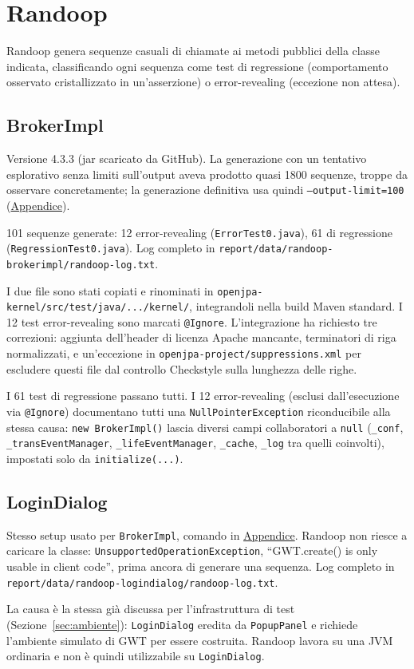 \section{Randoop}
\label{sec:randoop}

Randoop genera sequenze casuali di chiamate ai metodi pubblici della classe indicata,
classificando ogni sequenza come test di regressione (comportamento osservato cristallizzato in
un'asserzione) o error-revealing (eccezione non attesa).

\subsection{BrokerImpl}

Versione 4.3.3 (jar scaricato da GitHub).
La generazione con un tentativo esplorativo senza limiti sull'output aveva prodotto
quasi 1800 sequenze, troppe da osservare concretamente; la generazione definitiva usa quindi
\texttt{--output-limit=100} (\hyperref[cmd:randoop-brokerimpl]{Appendice}).

101 sequenze generate: 12 error-revealing (\texttt{ErrorTest0.java}), 61 di regressione
(\texttt{RegressionTest0.java}). Log completo in
\texttt{report/data/randoop-brokerimpl/randoop-log.txt}.

I due file sono stati copiati e rinominati in \texttt{openjpa-kernel/src/test/java/.../kernel/}, integrandoli
nella build Maven standard. I 12 test error-revealing sono marcati \texttt{@Ignore}. L'integrazione ha
richiesto tre correzioni: aggiunta dell'header di licenza Apache mancante, terminatori di riga normalizzati, e un'eccezione in
\texttt{openjpa-project/suppressions.xml} per escludere questi file dal controllo Checkstyle sulla
lunghezza delle righe.

I 61 test di regressione passano tutti. I 12 error-revealing (esclusi dall'esecuzione via
\texttt{@Ignore}) documentano tutti una \texttt{NullPointerException} riconducibile alla stessa
causa: \texttt{new BrokerImpl()} lascia diversi campi collaboratori a \texttt{null}
(\texttt{\_conf}, \texttt{\_transEventManager}, \texttt{\_lifeEventManager}, \texttt{\_cache},
\texttt{\_log} tra quelli coinvolti), impostati solo da \texttt{initialize(...)}.

\subsection{LoginDialog}

Stesso setup usato per \texttt{BrokerImpl}, comando in
\hyperref[cmd:randoop-logindialog]{Appendice}. Randoop non riesce a caricare la classe:
\texttt{UnsupportedOperationException}, ``GWT.create() is only usable in client code'', prima
ancora di generare una sequenza. Log completo in
\texttt{report/data/randoop-logindialog/randoop-log.txt}.

La causa è la stessa già discussa per l'infrastruttura di test (Sezione~\ref{sec:ambiente}):
\texttt{LoginDialog} eredita da \texttt{PopupPanel} e richiede l'ambiente simulato di GWT per
essere costruita. Randoop lavora su una JVM ordinaria e non è quindi utilizzabile su \texttt{LoginDialog}.
